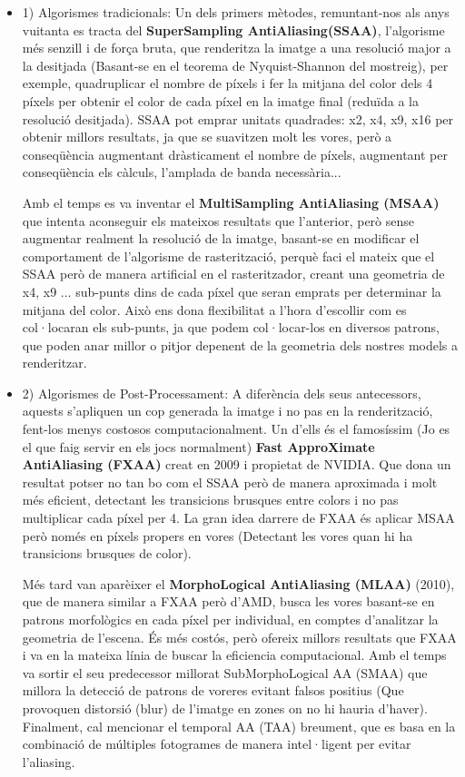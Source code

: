 \documentclass[12pt]{article}
\begin{document}
\begin{itemize}
    \item 1) Algorismes tradicionals: Un dels primers mètodes, remuntant-nos als anys vuitanta es tracta del \textbf{SuperSampling AntiAliasing(SSAA)}, l'algorisme més senzill i de força bruta, que renderitza la imatge a una resolució major a la desitjada (Basant-se en el teorema de Nyquist-Shannon del mostreig), per exemple, quadruplicar el nombre de píxels i fer la mitjana del color dels 4 píxels per obtenir el color de cada píxel en la imatge final (reduïda a la resolució desitjada). SSAA pot emprar unitats quadrades: x2, x4, x9, x16 per obtenir millors resultats, ja que se suavitzen molt les vores, però a conseqüència augmentant dràsticament el nombre de píxels, augmentant per conseqüència els càlculs, l'amplada de banda necessària...

    Amb el temps es va inventar el \textbf{MultiSampling AntiAliasing (MSAA)} que intenta aconseguir els mateixos resultats que l'anterior, però sense augmentar realment la resolució de la imatge, basant-se en modificar el comportament de l'algorisme de rasterització, perquè faci el mateix que el SSAA però de manera artificial en el rasteritzador, creant una geometria de x4, x9 ... sub-punts dins de cada píxel que seran emprats per determinar la mitjana del color\cite{learnopengl_antialiasing}. Això ens dona flexibilitat a l'hora d'escollir com es col·locaran els sub-punts, ja que podem col·locar-los en diversos patrons, que poden anar millor o pitjor depenent de la geometria dels nostres models a renderitzar.
    
    \item 2) Algorismes de Post-Processament: A diferència dels seus antecessors, aquests s'apliquen un cop generada la imatge i no pas en la renderització, fent-los menys costosos computacionalment. Un d'ells és el famosíssim (Jo es el que faig servir en els jocs normalment) \textbf{Fast ApproXimate AntiAliasing (FXAA)} creat en 2009 i propietat de NVIDIA. Que dona un resultat potser no tan bo com el SSAA però de manera aproximada i molt més eficient, detectant les transicions brusques entre colors i no pas multiplicar cada píxel per 4. La gran idea darrere de FXAA és aplicar MSAA però només en píxels propers en vores (Detectant les vores quan hi ha transicions brusques de color).

    Més tard van aparèixer el \textbf{MorphoLogical AntiAliasing (MLAA)} (2010), que de manera similar a FXAA però d'AMD, busca les vores basant-se en patrons morfològics en cada píxel per individual, en comptes d'analitzar la geometria de l'escena. És més costós, però ofereix millors resultats que FXAA i va en la mateixa línia de buscar la  eficiencia computacional. Amb el temps va sortir el seu predecessor millorat SubMorphoLogical AA (SMAA) que millora la detecció de patrons de voreres evitant falsos positius (Que provoquen distorsió (blur) de l'imatge en zones on no hi hauria d'haver). Finalment, cal mencionar el temporal AA (TAA) breument, que es basa en la combinació de múltiples fotogrames de manera intel·ligent per evitar l'aliasing.


\end{itemize}
\end{document}
